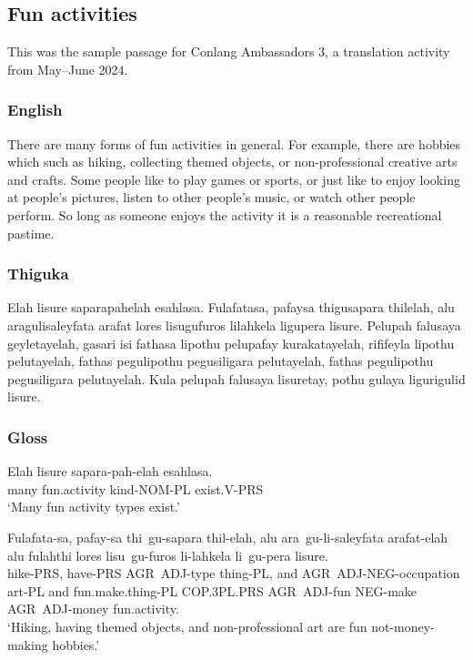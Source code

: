 \newpage

\subsection{Fun activities}
This was the sample passage for Conlang Ambassadors 3, a translation activity from May--June 2024.
\subsubsection*{English}
There are many forms of fun activities in general.
For example, there are hobbies which such as hiking, collecting themed objects, or non-professional creative arts and crafts.
Some people like to play games or sports, or just like to enjoy looking at people's pictures, listen to other people's music, or watch other people perform.
So long as someone enjoys the activity it is a reasonable recreational pastime.

\subsubsection*{Thiguka}
Elah lisure saparapahelah esahlasa.
Fulafatasa, pafaysa thigusapara thilelah, alu aragulisaleyfata arafat lores lisugufuros lilahkela ligupera lisure.
Pelupah falusaya geyletayelah, gasari isi fathasa lipothu pelupafay kurakatayelah, rififeyla lipothu pelutayelah, fathas pegulipothu pegusiligara pelutayelah, fathas pegulipothu pegusiligara pelutayelah.
Kula pelupah falusaya lisuretay, pothu gulaya ligurigulid lisure.

\subsubsection*{Gloss}
\begin{exe}
\ex{} \gll{}Elah lisure sapara-pah-elah esahlasa.\\
many fun.activity kind-NOM-PL exist.V-PRS\\
\glt{}`Many fun activity types exist.'
\end{exe}

\begin{exe}
\ex{} \gll{}Fulafata-sa, pafay-sa thi~gu-sapara thil-elah, alu ara~gu-li-saleyfata arafat-elah alu fulahthi lores lisu~gu-furos li-lahkela li~gu-pera lisure.\\
hike-PRS, have-PRS AGR~ADJ-type thing-PL, and AGR~ADJ-NEG-occupation art-PL and fun.make.thing-PL COP.3PL.PRS AGR~ADJ-fun NEG-make AGR~ADJ-money fun.activity.\\
\glt{}`Hiking, having themed objects, and non-professional art are fun not-money-making hobbies.'
\end{exe}


